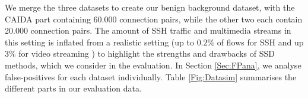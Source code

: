 \documentclass[runningheads,11pt]{llncs}\usepackage[]{graphicx}\usepackage[]{color}
\begin{document}
We merge the three datasets to create our benign background dataset, with the CAIDA part containing 60.000 connection pairs, while the other two each contain 20.000 connection pairs. 
The amount of SSH traffic and multimedia streams in this setting is inflated from a realistic setting (up to $0.2\%$ of flows for SSH and up $3\%$ for video streaming \cite{velan2016network}) to highlight the strengths and drawbacks of SSD methods, which we consider in the evaluation. %
In Section \ref{Sec:FPana}, we analyse false-positives for each dataset individually.
Table \ref{Fig:Datasim} summarises the different parts in our evaluation data.

\end{document}
